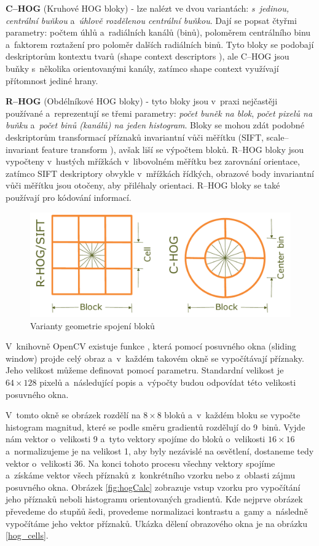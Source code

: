 \textbf{C--HOG} (Kruhové HOG bloky) - lze nalézt ve dvou variantách: \textit{s~jedinou, centrální buňkou} a~\textit{úhlově rozdělenou centrální buňkou}. Dají se popsat čtyřmi parametry: počtem úhlů a~radiálních kanálů (binů), poloměrem centrálního binu a~faktorem roztažení pro poloměr dalších radiálních binů.  Tyto bloky se podobají deskriptorům kontextu tvarů (shape context descriptors \cite{shapeContext}), ale C--HOG jsou buňky s~několika orientovanými kanály, zatímco shape context využívají přítomnost jediné hrany.

\textbf{R--HOG} (Obdélníkové HOG bloky) - tyto bloky jsou v~praxi nejčastěji používané a~reprezentují se třemi parametry: \textit{počet buněk na blok}, \textit{počet pixelů na buňku} a~\textit{počet binů (kanálů) na jeden histogram}. Bloky se mohou zdát podobné deskriptorům transformací příznaků invariantní vůči měřítku (SIFT, scale--invariant feature transform  \cite{siftPaper}), avšak liší se výpočtem bloků. R--HOG bloky jsou vypočteny v~hustých mřížkách v~libovolném měřítku bez zarovnání orientace, zatímco SIFT deskriptory obvykle v~mřížkách řídkých, obrazové body invariantní vůči měřítku jsou otočeny, aby přiléhaly orientaci. R--HOG bloky se také používají pro kódování informací. 
\begin{figure}[H]
  \centering
  \includegraphics[width=14cm]{figures/hog_variants.pdf}
  \caption{Varianty geometrie spojení bloků \cite{hog:dalal}}
  \label{variants_block}
\end{figure}
V~knihovně OpenCV existuje funkce , která pomocí posuvného okna (sliding window) projde celý obraz a~v~každém takovém okně se vypočítávají příznaky. Jeho velikost můžeme definovat pomocí parametru. Standardní velikost je $64\times128$ pixelů a~následující popis a~výpočty budou odpovídat této velikosti posuvného okna.  

V~tomto okně se obrázek rozdělí na $8\times8$ bloků a~v~každém bloku se vypočte histogram magnitud, které se podle směru gradientů rozdělují do 9~binů. Vyjde nám vektor o~velikosti 9 a~tyto vektory spojíme do bloků o~velikosti $16\times16$ a~normalizujeme je na velikost 1, aby byly nezávislé na osvětlení, dostaneme tedy vektor o~velikosti 36. Na konci tohoto procesu všechny vektory spojíme a~získáme vektor všech příznaků z~konkrétního vzorku nebo z~oblasti zájmu posuvného okna. Obrázek \ref{fig:hogCalc} zobrazuje vstup vzorku pro vypočítání jeho příznaků neboli histogramu orientovaných gradientů. Kde nejprve obrázek převedeme do stupňů šedi, provedeme normalizaci kontrastu a~gamy a~následně vypočítáme jeho vektor příznaků.
Ukázka dělení obrazového okna je na obrázku \ref{hog_cells}.

